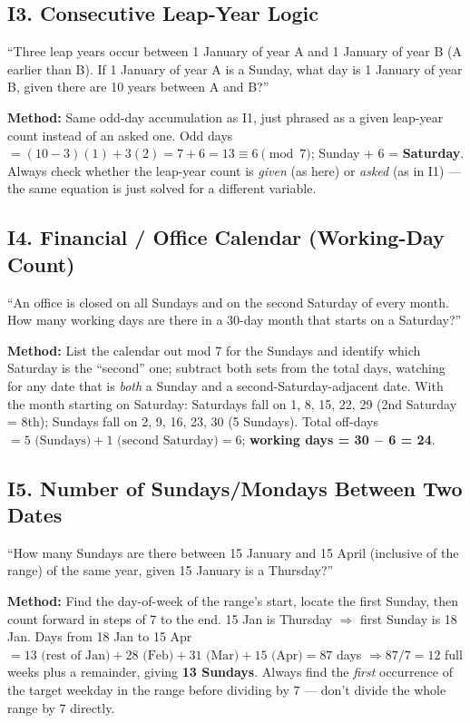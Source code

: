 \documentclass[11pt]{article}
\begin{document}
\subsection*{I3. Consecutive Leap-Year Logic}
\begin{tipbox}[Phrasing]
``Three leap years occur between 1 January of year A and 1 January of year B (A earlier than B). If 1
January of year A is a Sunday, what day is 1 January of year B, given there are 10 years between A
and B?''
\end{tipbox}
\textbf{Method:} Same odd-day accumulation as I1, just phrased as a given leap-year count instead of
an asked one. Odd days $=(10-3)(1)+3(2)=7+6=13\equiv6\pmod7$; Sunday + 6 = \textbf{Saturday}. Always
check whether the leap-year count is \emph{given} (as here) or \emph{asked} (as in I1) --- the same
equation is just solved for a different variable.

\subsection*{I4. Financial / Office Calendar (Working-Day Count)}
\begin{tipbox}[Phrasing]
``An office is closed on all Sundays and on the second Saturday of every month. How many working days
are there in a 30-day month that starts on a Saturday?''
\end{tipbox}
\textbf{Method:} List the calendar out mod 7 for the Sundays and identify which Saturday is the
``second'' one; subtract both sets from the total days, watching for any date that is \emph{both} a
Sunday and a second-Saturday-adjacent date. With the month starting on Saturday: Saturdays fall on 1,
8, 15, 22, 29 (2nd Saturday = 8th); Sundays fall on 2, 9, 16, 23, 30 (5 Sundays). Total off-days
$=5\text{ (Sundays)}+1\text{ (second Saturday)}=6$; \textbf{working days = 30 $-$ 6 = 24}.

\subsection*{I5. Number of Sundays/Mondays Between Two Dates}
\begin{tipbox}[Phrasing]
``How many Sundays are there between 15 January and 15 April (inclusive of the range) of the same
year, given 15 January is a Thursday?''
\end{tipbox}
\textbf{Method:} Find the day-of-week of the range's start, locate the first Sunday, then count
forward in steps of 7 to the end. 15 Jan is Thursday $\Rightarrow$ first Sunday is 18 Jan. Days from
18 Jan to 15 Apr $=13\text{ (rest of Jan)}+28\text{ (Feb)}+31\text{ (Mar)}+15\text{ (Apr)}=87$ days
$\Rightarrow 87/7=12$ full weeks plus a remainder, giving \textbf{13 Sundays}. Always find the
\emph{first} occurrence of the target weekday in the range before dividing by 7 --- don't divide the
whole range by 7 directly.
\end{document}
